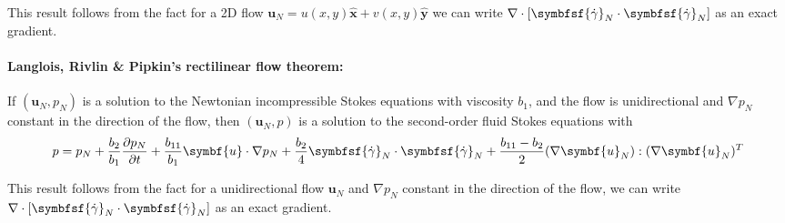 \documentclass{jknotes}
\begin{document}
This result follows from the fact for a 2D flow $\symbf{u}_N = u(x,y)\hat{\symbf{x}} +
v(x,y) \hat{\symbf{y}}$ we can write $\nabla \cdot \left[ \symbfsf{\srate}_N
\cdot \symbfsf{\srate}_N\right]$ as an exact gradient.

\paragraph{Langlois, Rivlin \& Pipkin's rectilinear flow theorem:} If
$(\symbf{u}_N, p_N)$ is a solution to the Newtonian incompressible Stokes
equations with viscosity $b_1$, and the flow is unidirectional and $\nabla
p_N$ constant in the direction of the flow, then $(\symbf{u}_N, p)$ is a
solution to the second-order fluid Stokes equations with
\begin{equation}
	p = p_N + \frac{b_2}{b_1} \frac{\partial p_N}{\partial t} +
	\frac{b_{11}}{b_1} \symbf{u} \cdot \nabla p_N + \frac{b_2}{4}
	\symbfsf{\srate}_N \cdot \symbfsf{\srate}_N + \frac{b_{11}-b_2}{2} (\nabla
	\symbf{u}_N) : (\nabla \symbf{u}_N)^T
\end{equation}

This result follows from the fact for a unidirectional flow $\symbf{u}_N$ and
$\nabla p_N$ constant in the direction of the flow, we can write $\nabla \cdot
\left[ \symbfsf{\srate}_N \cdot \symbfsf{\srate}_N\right]$ as an exact
gradient.
\end{document}
